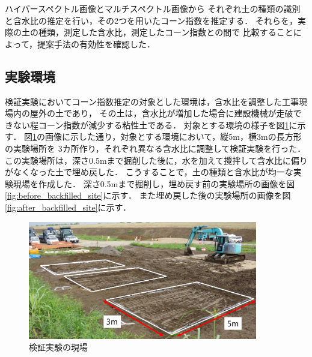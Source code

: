 
ハイパースペクトル画像とマルチスペクトル画像から
それぞれ土の種類の識別と含水比の推定を行い，その2つを用いたコーン指数を推定する．
それらを，実際の土の種類，測定した含水比，測定したコーン指数との間で
比較することによって，提案手法の有効性を確認した．

\subsection{実験環境}
\label{ssec:ConeindexEstimationExperimentSetting}


検証実験においてコーン指数推定の対象とした環境は，含水比を調整した工事現場内の屋外の土であり，
その土は，含水比が増加した場合に建設機械が走破できない程コーン指数が減少する粘性土である．
対象とする環境の様子を図\ref{fig:experimental_area}に示す．
図\ref{fig:experimental_area}の画像に示した通り，対象とする環境において，縦5m，横3mの長方形の実験場所を%
3カ所作り，それぞれ異なる含水比に調整して検証実験を行った．
この実験場所は，深さ0.5mまで掘削した後に，水を加えて攪拌して含水比に偏りがなくなった土で埋め戻した．
こうすることで，土の種類と含水比が均一な実験現場を作成した．
深さ0.5mまで掘削し，埋め戻す前の実験場所の画像を図\ref{fig:before_backfilled_site}に示す．
また埋め戻した後の実験場所の画像を図\ref{fig:after_backfilled_site}に示す．

\begin{figure}[b]
      \begin{center}
            \includegraphics[width=10cm]{./Ch5_ConeIndexEstimation/Fig/experimental_area_compressed.pdf}
            \caption{検証実験の現場}
            \label{fig:experimental_area}
      \end{center}
\end{figure}

